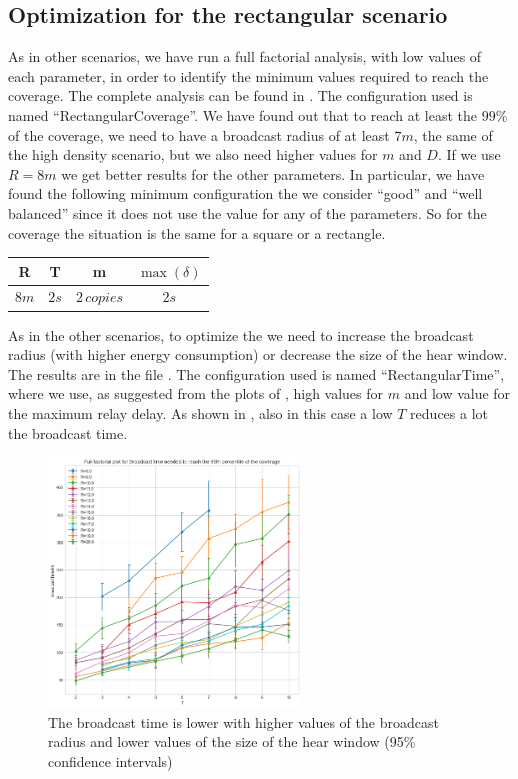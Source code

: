 \subsection{Optimization for the rectangular
scenario}\label{subsec:rectoptimization}

As in other scenarios, we have run a full factorial analysis, with low values of
each parameter, in order to identify the minimum values required to reach the
coverage. The complete analysis can be found in . The
configuration used is named ``RectangularCoverage''. We have found out that to
reach at least the \(99\%\) of the coverage, we need to have a broadcast radius
of at least \(7m\), the same of the high density scenario, but we also need
higher values for \(m\) and \(D\). If we use \(R\!=\!8m\) we get better results
for the other parameters. In particular, we have found the following minimum
configuration the we consider ``good'' and ``well balanced'' since it does not
use the value  for any of the parameters. So for the coverage the
situation is the same for a square or a rectangle.

\begin{center}
	\begin{tabular}{cccc}
		\toprule
		R & T & m & \(\max(\delta)\) \\
		\midrule
		\(8m\) & \(2s\) & \(2\,\mathit{copies}\) & \(2s\) \\
		\bottomrule
	\end{tabular}
\end{center}

As in the other scenarios, to optimize the  we
need to increase the broadcast radius (with higher energy consumption) or
decrease the size of the hear window. The results are in the file
. The configuration used is named
``RectangularTime'', where we use, as suggested from the plots of
, high values for \(m\) and low value for the maximum relay
delay. As shown in , also in this case a low \(T\)
reduces a lot the broadcast time.

\begin{figure}[hbt]
	\centering
	\includegraphics[width=0.6\textwidth]{img/rect/broadcasttime-T-ffplot.png}
	\caption{The broadcast time is lower with higher values of the broadcast
	radius and lower values of the size of the hear window (95\% confidence
	intervals)}\label{fig:recttimeff}
\end{figure}

